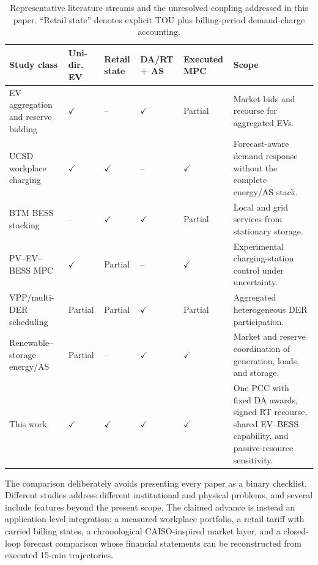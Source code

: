 \documentclass[final,5p,times]{elsarticle}
\begin{document}
\begin{table}[!t]
\centering
\caption{Representative literature streams and the unresolved coupling addressed in this paper. ``Retail state'' denotes explicit TOU plus billing-period demand-charge accounting.}
\label{tab:literature_gap}
\scriptsize
\setlength{\tabcolsep}{3.5pt}
\begin{tabularx}{\textwidth}{@{}p{}*{4}{>{\centering\arraybackslash}p{}}X@{}}
\toprule
Study class & Uni-dir. EV & Retail state & DA/RT + AS & Executed MPC & Scope \\
\midrule
EV aggregation and reserve bidding~\cite{vagropoulos2013optimal} \cite{bessa2014optimization} & $\checkmark$ & -- & $\checkmark$ & Partial & Market bids and recourse for aggregated EVs.\\
UCSD workplace charging~\cite{chen2024costoptimal} \cite{chen2026realtime} & $\checkmark$ & $\checkmark$ & -- & $\checkmark$ & Forecast-aware demand response without the complete energy/AS stack.\\
BTM BESS stacking~\cite{hanif2022multiservice} \cite{seward2022revenueStacking} \cite{idomar2026stacked} & -- & $\checkmark$ & $\checkmark$ & Partial & Local and grid services from stationary storage.\\
PV--EV--BESS MPC~\cite{cabrera2022realtime} \cite{cabrera2024robust} & $\checkmark$ & Partial & -- & $\checkmark$ & Experimental charging-station control under uncertainty.\\
VPP/multi-DER scheduling~\cite{pudjianto2007vpp} \cite{zamani2016vpp} \cite{qiu2017transactive} & Partial & Partial & $\checkmark$ & Partial & Aggregated heterogeneous DER participation.\\
Renewable--storage energy/AS~\cite{santosuosso2024sempc} \cite{warmerdam2026power} & Partial & -- & $\checkmark$ & $\checkmark$ & Market and reserve coordination of generation, loads, and storage.\\
This work & $\checkmark$ & $\checkmark$ & $\checkmark$ & $\checkmark$ & One PCC with fixed DA awards, signed RT recourse, shared EV--BESS capability, and passive-resource sensitivity.\\
\bottomrule
\end{tabularx}
\end{table}

The comparison deliberately avoids presenting every paper as a binary checklist. Different studies address different institutional and physical problems, and several include features beyond the present scope. The claimed advance is instead an application-level integration: a measured workplace portfolio, a retail tariff with carried billing states, a chronological CAISO-inspired market layer, and a closed-loop forecast comparison whose financial statements can be reconstructed from executed 15-min trajectories.
\end{document}
